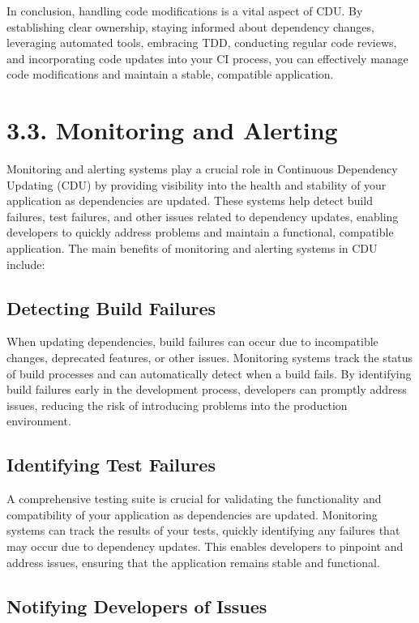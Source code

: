 \documentclass[10pt]{article}
\begin{document}
In conclusion, handling code modifications is a vital aspect of CDU. By establishing clear ownership, staying informed about dependency changes, leveraging automated tools, embracing TDD, conducting regular code reviews, and incorporating code updates into your CI process, you can effectively manage code modifications and maintain a stable, compatible application.

\section*{3.3. Monitoring and Alerting}

Monitoring and alerting systems play a crucial role in Continuous Dependency Updating (CDU) by providing visibility into the health and stability of your application as dependencies are updated. These systems help detect build failures, test failures, and other issues related to dependency updates, enabling developers to quickly address problems and maintain a functional, compatible application. The main benefits of monitoring and alerting systems in CDU include:

\subsection*{Detecting Build Failures}

When updating dependencies, build failures can occur due to incompatible changes, deprecated features, or other issues. Monitoring systems track the status of build processes and can automatically detect when a build fails. By identifying build failures early in the development process, developers can promptly address issues, reducing the risk of introducing problems into the production environment.

\subsection*{Identifying Test Failures}

A comprehensive testing suite is crucial for validating the functionality and compatibility of your application as dependencies are updated. Monitoring systems can track the results of your tests, quickly identifying any failures that may occur due to dependency updates. This enables developers to pinpoint and address issues, ensuring that the application remains stable and functional.

\subsection*{Notifying Developers of Issues}
\end{document}
